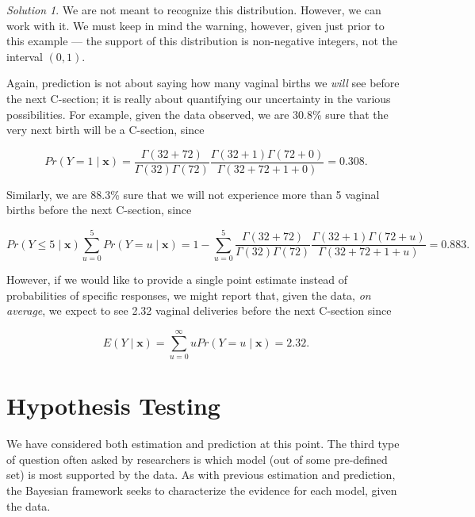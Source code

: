 \documentclass[
  letterpaper,
  DIV=11,
  numbers=noendperiod]{scrreprt}
\theoremstyle{definition}
\theoremstyle{plain}
\theoremstyle{definition}
\theoremstyle{remark}
\newtheorem*{solution}{Solution}
\begin{document}
\begin{solution}
We are not meant to recognize this distribution. However, we can work
with it. We must keep in mind the warning, however, given just prior to
this example --- the support of this distribution is non-negative
integers, not the interval \((0, 1)\).

Again, prediction is not about saying how many vaginal births we
\emph{will} see before the next C-section; it is really about
quantifying our uncertainty in the various possibilities. For example,
given the data observed, we are 30.8\% sure that the very next birth
will be a C-section, since

\[Pr(Y = 1 \mid \mathbf{x}) = \frac{\Gamma(32 + 72)}{\Gamma(32) \Gamma(72)} \frac{\Gamma(32 + 1) \Gamma(72 + 0)}{\Gamma(32 + 72 + 1 + 0)} = 0.308.\]

Similarly, we are 88.3\% sure that we will not experience more than 5
vaginal births before the next C-section, since

\[Pr(Y \leq 5 \mid \mathbf{x}) \sum_{u=0}^{5} Pr(Y = u \mid \mathbf{x}) = 1 - \sum_{u=0}^{5} \frac{\Gamma(32 + 72)}{\Gamma(32) \Gamma(72)} \frac{\Gamma(32 + 1) \Gamma(72 + u)}{\Gamma(32 + 72 + 1 + u)} = 0.883.\]

However, if we would like to provide a single point estimate instead of
probabilities of specific responses, we might report that, given the
data, \emph{on average}, we expect to see 2.32 vaginal deliveries before
the next C-section since

\[E\left(Y \mid \mathbf{x}\right) = \sum_{u=0}^{\infty} u Pr(Y = u \mid \mathbf{x}) = 2.32.\]

\end{solution}

\hypertarget{sec-hypothesis-testing}{%
\chapter{Hypothesis Testing}\label{sec-hypothesis-testing}}

\providecommand{\norm}[1]{\lVert#1\rVert}
\providecommand{\abs}[1]{\lvert#1\rvert}
\providecommand{\iid}{\stackrel{\text{IID}}{\sim}}
\providecommand{\ind}{\stackrel{\text{Ind}}{\sim}}

\providecommand{\bm}[1]{\mathbf{#1}}
\providecommand{\bs}[1]{\boldsymbol{#1}}
\providecommand{\bbeta}{\bs{\beta}}

\providecommand{\Ell}{\mathcal{L}}
\providecommand{\indep}{\perp\negthickspace\negmedspace\perp}

We have considered both estimation and prediction at this point. The
third type of question often asked by researchers is which model (out of
some pre-defined set) is most supported by the data. As with previous
estimation and prediction, the Bayesian framework seeks to characterize
the evidence for each model, given the data.
\end{document}
